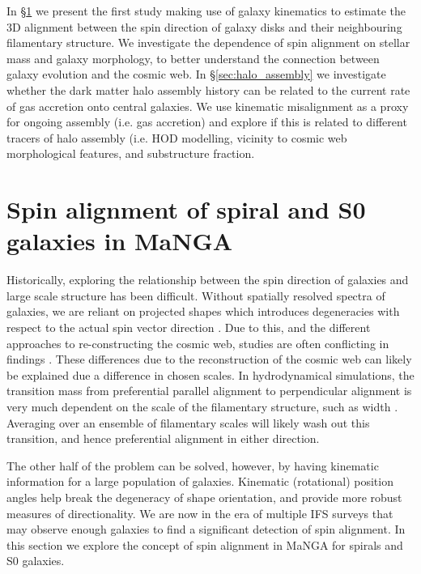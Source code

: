 In \S\ref{sec:spin_alignment} we present the first study making use of galaxy kinematics to estimate the 3D alignment between the spin direction of galaxy disks and their neighbouring filamentary structure. We investigate the dependence of spin alignment on stellar mass and galaxy morphology, to better understand the connection between galaxy evolution and the cosmic web. In \S\ref{sec:halo_assembly} we investigate whether the dark matter halo assembly history can be related to the current rate of gas accretion onto central galaxies. We use kinematic misalignment as a proxy for ongoing assembly (i.e. gas accretion) and explore if this is related to different tracers of halo assembly (i.e. HOD modelling, vicinity to cosmic web morphological features, and substructure fraction. 

\section{Spin alignment of spiral and S0 galaxies in MaNGA} \label{sec:spin_alignment}

Historically, exploring the relationship between the spin direction of galaxies and large scale structure has been difficult. Without spatially resolved spectra of galaxies, we are reliant on projected shapes which introduces degeneracies with respect to the actual spin vector direction \citep[e.g. see Fig 2. in][for example of degeneracies that can occur]{motloch2020}. Due to this, and the different approaches to re-constructing the cosmic web, studies are often conflicting in findings \citep[e.g. spiral galaxies having parallel vs perpendicular orientations with respect to the cosmic web][]{tempel2013a, tempel2013, lee2007, jones2010, zhang2015}. These differences due to the reconstruction of the cosmic web can likely be explained due a difference in chosen scales. In hydrodynamical simulations, the transition mass from preferential parallel alignment to perpendicular alignment is very much dependent on the scale of the filamentary structure, such as width \citep{ganeshaiahveena2019, Kraljic2019flip}. Averaging over an ensemble of filamentary scales will likely wash out this transition, and hence preferential alignment in either direction. 

The other half of the problem can be solved, however, by having kinematic information for a large population of galaxies. Kinematic (rotational) position angles help break the degeneracy of shape orientation, and provide more robust measures of directionality. We are now in the era of multiple IFS surveys that may observe enough galaxies to find a significant detection of spin alignment. In this section we explore the concept of spin alignment in MaNGA for spirals and S0 galaxies.

